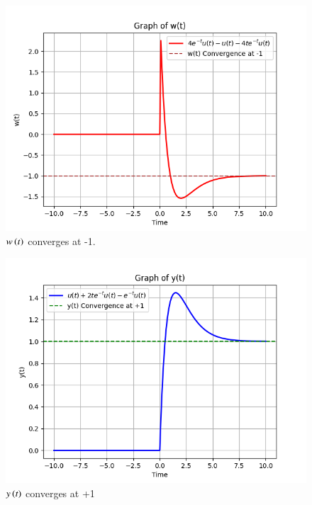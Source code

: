 \documentclass[journal,12pt,twocolumn]{IEEEtran}
\theoremstyle{remark}
\begin{document}
\begin{enumerate}
\begin{figure}[H]
    \includegraphics[width=1\columnwidth]{figs/Plot of w(t).png}
    \caption{$w\left(t\right)$ converges at -1.}
    \label{fig:w_t}
\end{figure}

\begin{figure}[H]
    \includegraphics[width=1\columnwidth]{figs/Plot of y(t).png}
    \caption{$y\left(t\right)$ converges at +1}
    \label{fig:y_t}
\end{figure}

\end{enumerate}
\end{document}
